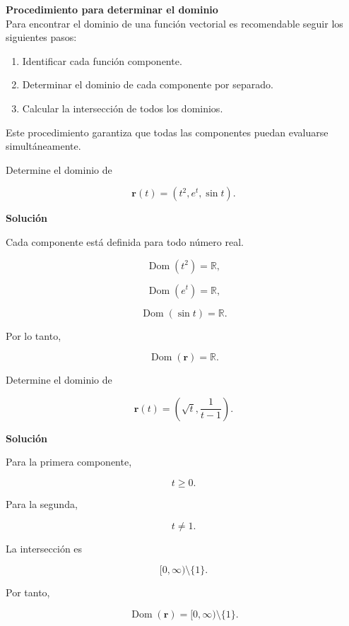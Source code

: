 \textbf{Procedimiento para determinar el dominio}\\

Para encontrar el dominio de una función vectorial es recomendable seguir los siguientes pasos:

\begin{enumerate}
    \item Identificar cada función componente.
    \item Determinar el dominio de cada componente por separado.
    \item Calcular la intersección de todos los dominios.
\end{enumerate}

Este procedimiento garantiza que todas las componentes puedan evaluarse simultáneamente.

\newpage 

\begin{ejercicio}[]

Determine el dominio de

\[
\mathbf{r}(t)=
\left(
t^2,
e^t,
\sin t
\right).
\]

\textbf{Solución}

Cada componente está definida para todo número real.

\[
\operatorname{Dom}(t^2)=\mathbb{R},
\]

\[
\operatorname{Dom}(e^t)=\mathbb{R},
\]

\[
\operatorname{Dom}(\sin t)=\mathbb{R}.
\]

Por lo tanto,

\[
\boxed{\operatorname{Dom}(\mathbf{r})=\mathbb{R}.}
\]

\end{ejercicio}

\begin{ejercicio}[]

Determine el dominio de

\[
\mathbf{r}(t)=
\left(
\sqrt{t},
\frac1{t-1}
\right).
\]

\textbf{Solución}

Para la primera componente,

\[
t\ge0.
\]

Para la segunda,

\[
t\neq1.
\]

La intersección es

\[
[0,\infty)\setminus\{1\}.
\]

Por tanto,

\[
\boxed{\operatorname{Dom}(\mathbf{r})=[0,\infty)\setminus\{1\}.}
\]

\end{ejercicio}

